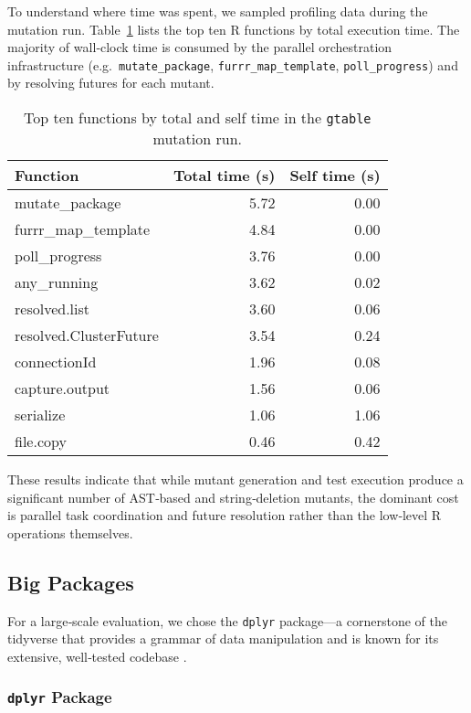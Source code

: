 To understand where time was spent, we sampled profiling data during the mutation run.  Table~\ref{tab:gtable-profile} lists the top ten R functions by total execution time.  The majority of wall‐clock time is consumed by the parallel orchestration infrastructure (e.g.\ \texttt{mutate\_package}, \texttt{furrr\_map\_template}, \texttt{poll\_progress}) and by resolving futures for each mutant.

\begin{table}[htbp]
  \centering
  \begin{tabular}{lrr}
    \hline\hline
    Function & Total time (s) & Self time (s) \\
    \hline
    mutate\_package & 5.72 & 0.00 \\
    furrr\_map\_template & 4.84 & 0.00 \\
    poll\_progress & 3.76 & 0.00 \\
    any\_running & 3.62 & 0.02 \\
    resolved.list & 3.60 & 0.06 \\
    resolved.ClusterFuture & 3.54 & 0.24 \\
    connectionId & 1.96 & 0.08 \\
    capture.output & 1.56 & 0.06 \\
    serialize & 1.06 & 1.06 \\
    file.copy & 0.46 & 0.42 \\
    \hline
  \end{tabular}
  \caption{Top ten functions by total and self time in the \texttt{gtable} mutation run.}
  \label{tab:gtable-profile}
\end{table}

These results indicate that while mutant generation and test execution produce a significant number of AST‐based and string‐deletion mutants, the dominant cost is parallel task coordination and future resolution rather than the low‐level R operations themselves.

\subsection{Big Packages}

For a large‐scale evaluation, we chose the \texttt{dplyr} package—a cornerstone of the tidyverse that provides a grammar of data manipulation and is known for its extensive, well‐tested codebase \cite{dplyr}.

\subsubsection{\texttt{dplyr} Package}

